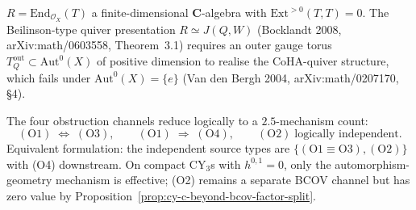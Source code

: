 \begin{theorem}
\begin{enumerate}[label=\textup{(O\arabic*)}]
 $R = \mathrm{End}_{\mathcal O_X}(T)$ a finite-dimensional
 $\mathbf C$-algebra with $\mathrm{Ext}^{>0}(T, T) = 0$. The
 Beilinson-type quiver presentation $R \simeq J(Q, W)$
 (Bocklandt 2008, arXiv:math/0603558, Theorem~3.1) requires an
 outer gauge torus $T_Q^{\mathrm{out}} \subset \mathrm{Aut}^0(X)$
 of positive dimension to realise the CoHA-quiver structure,
 which fails under $\mathrm{Aut}^0(X) = \{e\}$
 (Van den Bergh 2004, arXiv:math/0207170, \S 4).
\end{enumerate}
The four obstruction channels reduce logically to a $2.5$-mechanism count:
\[
 \boxed{\quad (\mathrm{O}1) \;\Longleftrightarrow\; (\mathrm{O}3),
 \qquad (\mathrm{O}1) \;\Longrightarrow\; (\mathrm{O}4),
 \qquad (\mathrm{O}2) \;\text{logically independent}. \quad}
\]
Equivalent formulation: the independent source types are
$\{(\mathrm{O}1 \equiv \mathrm{O}3), (\mathrm{O}2)\}$ with (O4)
downstream. On compact CY$_3$s with $h^{0,1}=0$, only the
automorphism-geometry mechanism is effective; (O2) remains a separate
BCOV channel but has zero value by Proposition~\ref{prop:cy-c-beyond-bcov-factor-split}.
\end{theorem}

